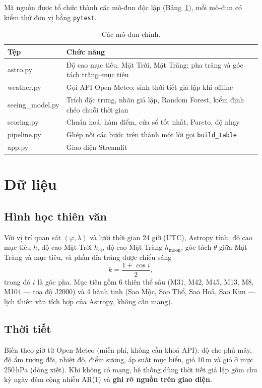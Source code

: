 \documentclass[12pt,a4paper]{article}
\begin{document}
Mã nguồn được tổ chức thành các mô-đun độc lập (Bảng~\ref{tab:modules}), mỗi mô-đun có
kiểm thử đơn vị bằng \texttt{pytest}.

\begin{table}[h]
\centering
\begin{tabularx}{\textwidth}{>{\ttfamily}l X}
\toprule
\normalfont\textbf{Tệp} & \textbf{Chức năng} \\
\midrule
astro.py        & Độ cao mục tiêu, Mặt Trời, Mặt Trăng; pha trăng và góc tách trăng--mục tiêu \\
weather.py      & Gọi API Open-Meteo; sinh thời tiết giả lập khi offline \\
seeing\_model.py & Trích đặc trưng, nhãn giả lập, Random Forest, kiểm định chéo chuỗi thời gian \\
scoring.py      & Chuẩn hoá, hàm điểm, cửa sổ tốt nhất, Pareto, độ nhạy \\
pipeline.py     & Ghép nối các bước trên thành một lời gọi \texttt{build\_table} \\
app.py          & Giao diện Streamlit \\
\bottomrule
\end{tabularx}
\caption{Các mô-đun chính.}
\label{tab:modules}
\end{table}

\section{Dữ liệu}

\subsection{Hình học thiên văn}
Với vị trí quan sát $(\varphi,\lambda)$ và lưới thời gian 24 giờ (UTC), Astropy tính:
độ cao mục tiêu $h$, độ cao Mặt Trời $h_\odot$, độ cao Mặt Trăng $h_{\text{moon}}$, góc tách
$\theta$ giữa Mặt Trăng và mục tiêu, và phần đĩa trăng được chiếu sáng
\begin{equation}
k = \frac{1+\cos i}{2},
\end{equation}
trong đó $i$ là góc pha. Mục tiêu gồm 6 thiên thể sâu (M31, M42, M45, M13, M8, M104 --- toạ độ
J2000) và 4 hành tinh (Sao Mộc, Sao Thổ, Sao Hoả, Sao Kim --- lịch thiên văn tích hợp của
Astropy, không cần mạng).

\subsection{Thời tiết}
Biến theo giờ từ Open-Meteo (miễn phí, không cần khoá API): độ che phủ mây, độ ẩm tương đối,
nhiệt độ, điểm sương, áp suất mực biển, gió 10\,m và gió ở mực 250\,hPa (dòng xiết).
Khi không có mạng, hệ thống dùng thời tiết giả lập gồm chu kỳ ngày đêm cộng nhiễu AR(1) và
\textbf{ghi rõ nguồn trên giao diện}.
\end{document}
